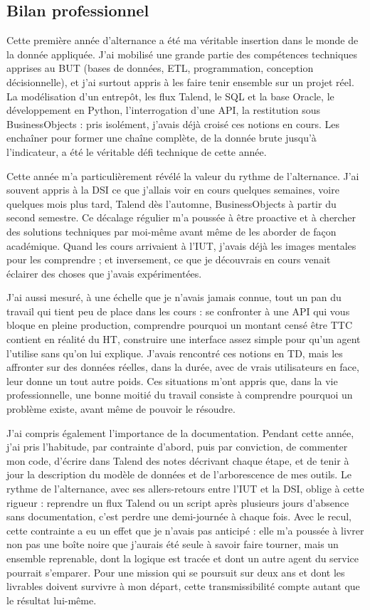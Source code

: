 \documentclass[11pt,a4paper]{article}
\begin{document}
\subsection*{Bilan professionnel}
Cette première année d'alternance a été ma véritable insertion dans le monde de la donnée appliquée. J'ai mobilisé une grande partie des compétences techniques apprises au BUT (bases de données, ETL, programmation, conception décisionnelle), et j'ai surtout appris à les faire tenir ensemble sur un projet réel. La modélisation d'un entrepôt, les flux Talend, le SQL et la base Oracle, le développement en Python, l'interrogation d'une API, la restitution sous BusinessObjects : pris isolément, j'avais déjà croisé ces notions en cours. Les enchaîner pour former une chaîne complète, de la donnée brute jusqu'à l'indicateur, a été le véritable défi technique de cette année.

Cette année m'a particulièrement révélé la valeur du rythme de l'alternance. J'ai souvent appris à la DSI ce que j'allais voir en cours quelques semaines, voire quelques mois plus tard, Talend dès l'automne, BusinessObjects à partir du second semestre. Ce décalage régulier m'a poussée à être proactive et à chercher des solutions techniques par moi-même avant même de les aborder de façon académique. Quand les cours arrivaient à l'IUT, j'avais déjà les images mentales pour les comprendre ; et inversement, ce que je découvrais en cours venait éclairer des choses que j'avais expérimentées.

J'ai aussi mesuré, à une échelle que je n'avais jamais connue, tout un pan du travail qui tient peu de place dans les cours : se confronter à une API qui vous bloque en pleine production, comprendre pourquoi un montant censé être TTC contient en réalité du HT, construire une interface assez simple pour qu'un agent l'utilise sans qu'on lui explique. J'avais rencontré ces notions en TD, mais les affronter sur des données réelles, dans la durée, avec de vrais utilisateurs en face, leur donne un tout autre poids. Ces situations m'ont appris que, dans la vie professionnelle, une bonne moitié du travail consiste à comprendre pourquoi un problème existe, avant même de pouvoir le résoudre.

J'ai compris également l'importance de la documentation. Pendant cette année, j'ai pris l'habitude, par contrainte d'abord, puis par conviction, de commenter mon code, d'écrire dans Talend des notes décrivant chaque étape, et de tenir à jour la description du modèle de données et de l'arborescence de mes outils. Le rythme de l'alternance, avec ses allers-retours entre l'IUT et la DSI, oblige à cette rigueur : reprendre un flux Talend ou un script après plusieurs jours d'absence sans documentation, c'est perdre une demi-journée à chaque fois. Avec le recul, cette contrainte a eu un effet que je n'avais pas anticipé : elle m'a poussée à livrer non pas une boîte noire que j'aurais été seule à savoir faire tourner, mais un ensemble reprenable, dont la logique est tracée et dont un autre agent du service pourrait s'emparer. Pour une mission qui se poursuit sur deux ans et dont les livrables doivent survivre à mon départ, cette transmissibilité compte autant que le résultat lui-même.
\end{document}
